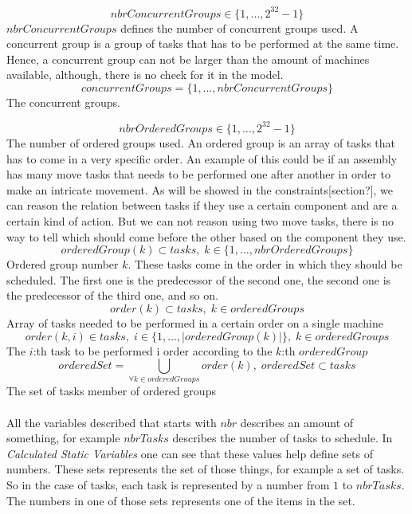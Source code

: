 \documentclass[10pt,a4paper]{report}
\begin{document}
\begin{equation}\label{eq:8}
nbrConcurrentGroups \in \{1 , \ldots , 2^{32}-1\}
\end{equation}
$nbrConcurrentGroups$ defines the number of concurrent groups used. A concurrent group is a group of tasks that has to be performed at the same time. Hence, a concurrent group can not be larger than the amount of machines available, although, there is no check for it in the model. 
\begin{equation}\label{eq:17}
concurrentGroups = \{1 , \ldots , nbrConcurrentGroups\}\end{equation}
The concurrent groups.

\begin{equation}\label{eq:9}
nbrOrderedGroups \in \{1 , \ldots , 2^{32}-1\}
\end{equation}
The number of ordered groups used. An ordered group is an array of tasks that has to come in a very specific order. An example of this could be if an assembly has many move tasks that needs to be performed one after another in order to make an intricate movement. As will be showed in the constraints[section?], we can reason the relation between tasks if they use a certain component and are a certain kind of action. But we can not reason using two move tasks, there is no way to tell which should come before the other based on the component they use.
\begin{equation}\label{eq:18}
orderedGroup(k) \subset tasks, \; k \in \{1 , \ldots , nbrOrderedGroups\}\end{equation}
Ordered group number $k$. These tasks come in the order in which they should be scheduled. The first one is the predecessor of the second one, the second one is the predecessor of the third one, and so on.
\begin{equation}\label{eq:31}
order(k) \subset tasks, \; k \in orderedGroups
\end{equation} 
Array of tasks needed to be performed in a certain order on a single machine
\begin{equation}\label{eq:32}
order(k,i) \in tasks, \; i \in \{1 , \ldots , |orderedGroup(k)|\}, \; k \in orderedGroups
\end{equation}
The $i$:th task to be performed i order according to the $k$:th $orderedGroup$
\begin{equation}\label{eq:39}
orderedSet = \bigcup_{\forall k \in orderedGroups}order(k), \; orderedSet \subset tasks\end{equation}
The set of tasks member of ordered groups
\\\\
All the variables described that starts with $nbr$ describes an amount of something, for example $nbrTasks$ describes the number of tasks to schedule. In \emph{Calculated Static Variables} one can see that these values help define sets of numbers. These sets represents the set of those things, for example a set of tasks. So in the case of tasks, each task is represented by a number from $1$ to $nbrTasks$. The numbers in one of those sets represents one of the items in the set.
\end{document}
